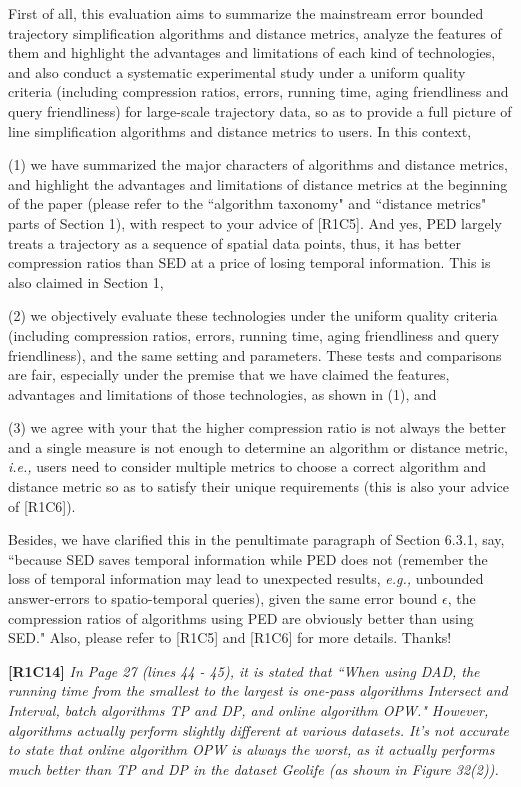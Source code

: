 \documentclass{letter}
\newcommand{\ie}{\emph{i.e.,}\xspace}
\newcommand{\eg}{\emph{e.g.,}\xspace}
\begin{document}
{First of all, this evaluation aims to summarize the mainstream error bounded trajectory simplification algorithms and distance metrics, analyze the features of them and highlight the advantages and limitations of each kind of technologies, and also conduct a systematic experimental study under a uniform quality criteria (including compression ratios, errors, running time, aging friendliness and query friendliness) for large-scale trajectory data, so as to provide a full picture of line simplification algorithms and distance metrics to users. In this context,

(1) we have summarized the major characters of algorithms and distance metrics, and highlight the advantages and limitations of distance metrics at the beginning of the paper (please refer to the ``algorithm taxonomy" and ``distance metrics" parts of Section 1), with respect to your advice of [R1C5]. And yes, PED largely treats a trajectory as a sequence of spatial data points, thus, it has better compression ratios than SED at a price of losing temporal information. This is also claimed in Section 1,

(2) we objectively evaluate these technologies under the uniform quality criteria (including compression ratios, errors, running time, aging friendliness and query friendliness), and the same setting and parameters. These tests and comparisons are fair, especially under the premise that we have claimed the features, advantages and limitations of those technologies, as shown in (1), and

(3) we agree with your that the higher compression ratio is not always the better and a single measure is not enough to determine an algorithm or distance metric, \ie users need to consider multiple metrics to choose a correct algorithm and distance metric so as to satisfy their unique requirements (this is also your advice of [R1C6]).

Besides, we have clarified this in the penultimate paragraph of Section 6.3.1, say, ``{because SED saves temporal information while PED does not (remember the loss of temporal information may lead to unexpected results, \eg unbounded answer-errors to spatio-temporal queries)}, given the same error bound $\epsilon$, the compression ratios of algorithms using PED are obviously better than using SED." Also, please refer to [R1C5] and [R1C6] for more details. Thanks!

\textbf{[R1C14]} \emph{ In Page 27 (lines 44 - 45), it is stated that ``When using DAD, the running time from the smallest to the largest is one-pass algorithms Intersect and Interval, batch algorithms TP and DP, and online algorithm OPW." However, algorithms actually perform slightly different at various datasets. It's not accurate to state that online algorithm OPW is always the worst, as it actually performs much better than TP and DP in the dataset Geolife (as shown in Figure 32(2)).}

}
\end{document}
